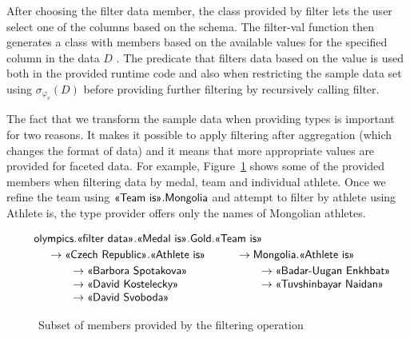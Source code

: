 \documentclass[a4paper,UKenglish]{lipics-v2016}
\theoremstyle{plain}
\theoremstyle{definition}
\newcommand{\ball}[1]{\FPeval{\result}{clip(201+#1)}\textnormal{\ding{\result}}}
\newcommand{\ident}[1]{\textnormal{\sffamily #1}}
\newcommand{\qident}[1]{\textnormal{\sffamily \guillemotleft #1\guillemotright}}
\begin{document}
After choosing the \qident{filter data} member, the class provided by \ident{filter} lets the 
user select one of the columns \ball{4} based on the schema. The \ident{filter-val} function then 
generates a class with members based on the available values for the specified column in the data 
$D$ \ball{5}. The predicate that filters data based on the value \ball{6} is used both in the 
provided runtime code and also when restricting the sample data set using $\sigma_{\varphi_v}(D)$ 
before providing further filtering by recursively calling \ident{filter}.

The fact that we transform the sample data when providing types is important for two reasons.
It makes it possible to apply filtering after aggregation (which changes the format of data)
and it means that more appropriate values are provided for faceted data. For example,
Figure~\ref{fig:pivot-filter} shows some of the provided members when filtering data by medal,
team and individual athlete. Once we refine the team using $\qident{Team is}.\ident{Mongolia}$
and attempt to filter by athlete using \qident{Athlete is}, the type provider offers only the
names of Mongolian athletes.

 
\begin{figure}
\begin{equation*}
\hspace{-1em}
\begin{array}{l}
\ident{olympics}.\qident{filter data}.\qident{Medal is}.\ident{Gold}.\qident{Team is}\\[0.25em]
\quad\begin{array}{l}
\rightarrow \qident{Czech Republic}.\qident{Athlete is}\\[0.25em]
\qquad \rightarrow \qident{Barbora Spotakova}\\
\qquad \rightarrow \qident{David Kostelecky}\\
\qquad \rightarrow \qident{David Svoboda}\\
\end{array}\qquad
\begin{array}{l}
\rightarrow \ident{Mongolia}.\qident{Athlete is}\\[0.25em]
\qquad \rightarrow \qident{Badar-Uugan Enkhbat}\\
\qquad \rightarrow \qident{Tuvshinbayar Naidan}\\
\\
\end{array}
\end{array}
\end{equation*}
\caption{Subset of members provided by the filtering operation}
\label{fig:pivot-filter}
\end{figure}
\end{document}
